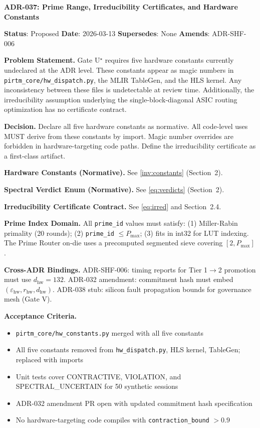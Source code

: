 \documentclass[12pt,letterpaper]{article}
\theoremstyle{plain}
\theoremstyle{definition}
\theoremstyle{remark}
\begin{document}
\begin{mdframed}[linewidth=1pt, linecolor=blue!60!black, backgroundcolor=blue!2!white]
\textbf{ADR-037: Prime Range, Irreducibility Certificates, and Hardware Constants}

\medskip
\textbf{Status}: Proposed \quad \textbf{Date}: 2026-03-13 \quad
\textbf{Supersedes}: None \quad \textbf{Amends}: ADR-SHF-006

\medskip
\textbf{Problem Statement.} Gate U\ensuremath{^{\star}} requires five hardware constants
currently undeclared at the ADR level. These constants appear as magic numbers
in \texttt{pirtm\_core/hw\_dispatch.py}, the MLIR TableGen, and the HLS kernel.
Any inconsistency between these files is undetectable at review time.
Additionally, the irreducibility assumption underlying the single-block-diagonal
ASIC routing optimization has no certificate contract.

\medskip
\textbf{Decision.} Declare all five hardware constants as normative. All code-level
uses MUST derive from these constants by import. Magic number overrides are
forbidden in hardware-targeting code paths. Define the irreducibility certificate
as a first-class artifact.

\medskip
\textbf{Hardware Constants (Normative).} See \cref{inv:constants} (Section~2).

\medskip
\textbf{Spectral Verdict Enum (Normative).} See \cref{eq:verdicts} (Section~2).

\medskip
\textbf{Irreducibility Certificate Contract.} See \cref{eq:irred} and
Section~2.4.

\medskip
\textbf{Prime Index Domain.} All \texttt{prime\_id} values must satisfy:
(1) Miller-Rabin primality (20 rounds); (2) \texttt{prime\_id} $\leq P_{\max}$;
(3) fits in int32 for LUT indexing. The Prime Router on-die uses a
precomputed segmented sieve covering $[2, P_{\max}]$.

\medskip
\textbf{Cross-ADR Bindings.}
ADR-SHF-006: timing reports for Tier 1$\to$2 promotion must use
$d_{\mathrm{hw}} = 132$.
ADR-032 amendment: commitment hash must embed $(\varepsilon_{\mathrm{hw}},
r_{\mathrm{hw}}, d_{\mathrm{hw}})$.
ADR-038 stub: silicon fault propagation bounds for governance mesh (Gate V).

\medskip
\textbf{Acceptance Criteria.}
\begin{itemize}[noitemsep]
  \item[\(\square\)] \texttt{pirtm\_core/hw\_constants.py} merged with all five constants
  \item[\(\square\)] All five constants removed from \texttt{hw\_dispatch.py},
        HLS kernel, TableGen; replaced with imports
  \item[\(\square\)] Unit tests cover CONTRACTIVE, VIOLATION, and
        SPECTRAL\_UNCERTAIN for 50 synthetic sessions
  \item[\(\square\)] ADR-032 amendment PR open with updated commitment hash specification
  \item[\(\square\)] No hardware-targeting code compiles with
        \texttt{contraction\_bound} $> 0.9$
\end{itemize}
\end{mdframed}
\end{document}
